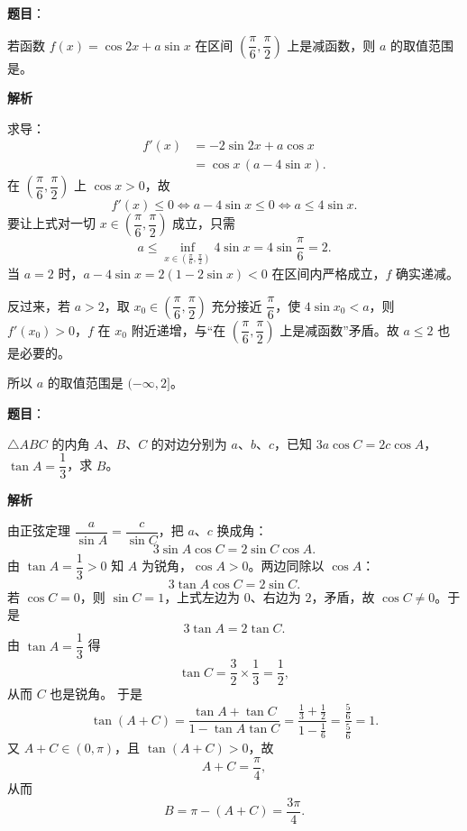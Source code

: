 \begin{answer}

\textbf{题目}：

若函数 $f(x)=\cos2x+a\sin x$ 在区间 $\left(\dfrac\pi6,\dfrac\pi2\right)$ 上是减函数，则 $a$ 的取值范围是\gkblank{}。

\textbf{解析}

求导：
\nopagebreak[4]
\[\begin{aligned}
f'(x)&=-2\sin2x+a\cos x\\
&=\cos x\,(a-4\sin x).
\end{aligned}\]
在 $\left(\dfrac\pi6,\dfrac\pi2\right)$ 上 $\cos x>0$，故
\nopagebreak[4]
\[f'(x)\leqslant0\iff a-4\sin x\leqslant0\iff a\leqslant4\sin x.\]
要让上式对一切 $x\in\left(\dfrac\pi6,\dfrac\pi2\right)$ 成立，只需
\nopagebreak[4]
\[a\leqslant\inf_{x\in(\frac\pi6,\frac\pi2)}4\sin x=4\sin\frac\pi6=2.\]
当 $a=2$ 时，$a-4\sin x=2(1-2\sin x)<0$ 在区间内严格成立，$f$ 确实递减。

反过来，若 $a>2$，取 $x_0\in\left(\dfrac\pi6,\dfrac\pi2\right)$ 充分接近 $\dfrac\pi6$，使 $4\sin x_0<a$，则 $f'(x_0)>0$，$f$ 在 $x_0$ 附近递增，与“在 $\left(\dfrac\pi6,\dfrac\pi2\right)$ 上是减函数”矛盾。故 $a\leqslant2$ 也是必要的。

所以 $a$ 的取值范围是 $(-\infty,2]$。

\gkanswer{答案：$(-\infty,2]$。在 $\left(\dfrac\pi6,\dfrac\pi2\right)$ 上 $\cos x>0$，$f'(x)\leqslant0$ 等价于 $a\leqslant4\sin x$ 恒成立，右端下确界为 $4\sin\dfrac\pi6=2$。}

\end{answer}
\begin{answer}

\textbf{题目}：

$\triangle ABC$ 的内角 $A$、$B$、$C$ 的对边分别为 $a$、$b$、$c$，已知 $3a\cos C=2c\cos A$，$\tan A=\dfrac13$，求 $B$。

\textbf{解析}

由正弦定理 $\dfrac{a}{\sin A}=\dfrac{c}{\sin C}$，把 $a$、$c$ 换成角：
\nopagebreak[4]
\[3\sin A\cos C=2\sin C\cos A.\]
由 $\tan A=\dfrac13>0$ 知 $A$ 为锐角，$\cos A>0$。两边同除以 $\cos A$：
\nopagebreak[4]
\[3\tan A\cos C=2\sin C.\]
若 $\cos C=0$，则 $\sin C=1$，上式左边为 $0$、右边为 $2$，矛盾，故 $\cos C\neq0$。于是
\nopagebreak[4]
\[3\tan A=2\tan C.\]
由 $\tan A=\dfrac13$ 得
\nopagebreak[4]
\[\tan C=\frac32\times\frac13=\frac12,\]
从而 $C$ 也是锐角。
于是
\nopagebreak[4]
\[\tan(A+C)=\frac{\tan A+\tan C}{1-\tan A\tan C}
=\frac{\frac13+\frac12}{1-\frac16}=\frac{\frac56}{\frac56}=1.\]
又 $A+C\in(0,\pi)$，且 $\tan(A+C)>0$，故
\nopagebreak[4]
\[A+C=\frac\pi4,\]
从而
\nopagebreak[4]
\[B=\pi-(A+C)=\frac{3\pi}{4}.\]


\end{answer}
